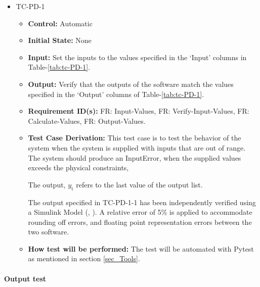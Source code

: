 \documentclass[12pt, titlepage]{article}
\begin{document}
\begin{itemize}
\item{TC-PD-1\\}
\begin{itemize}

\item{\textbf{Control:}} Automatic
					
\item{\textbf{Initial State:}} None
					
\item{\textbf{Input:}} Set the inputs to the values specified in the `Input' columns 
in Table-\ref{tab:tc-PD-1}.
					
\item{\textbf{Output:}}  Verify that the outputs of the software match the 
values specified in the `Output' columns of Table-\ref{tab:tc-PD-1}.


\item{\textbf{Requirement ID(s):}}  FR: Input-Values, FR: Verify-Input-Values, FR: Calculate-Values, FR: Output-Values.

\item{\textbf{Test Case Derivation:}}  This test case is to test the behavior of the system 
when the system is supplied with inputs that are out of range. The system should produce an InputError, when
the supplied values exceeds the physical constraints,

The output, ${y_{\text{t}}}$ refers to the last value of the output list.

The output specified in TC-PD-1-1 has been independently verified using a Simulink Model (\cite{Simulink}, 
\cite{PD_Controller}). A relative error of 5\% is applied to accommodate rounding off errors,
and floating point representation errors between the two software.

					
\item{\textbf{How test will be performed:}}  The test will be automated with Pytest as mentioned in 
section \ref{sec_Tools}. 
					
\end{itemize}
\end{itemize}

\paragraph{Output test}
\end{document}
